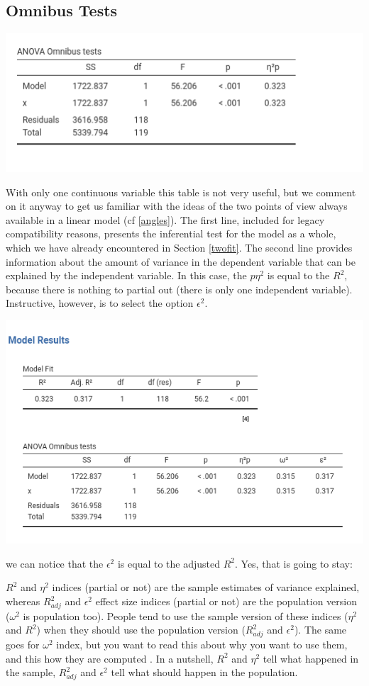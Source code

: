 \documentclass[
]{book}
\begin{document}
\hypertarget{omnibus-tests}{%
\subsection{Omnibus Tests}\label{omnibus-tests}}

\includegraphics[width=0.8\linewidth]{bookletpics/2_output3}

With only one continuous variable this table is not very useful, but we comment on it anyway to get us familiar with the ideas of the two points of view always available in a linear model (cf \ref{angles}). The first line, included for legacy compatibility reasons, presents the inferential test for the model as a whole, which we have already encountered in Section \ref{twofit}. The second line provides information about the amount of variance in the dependent variable that can be explained by the independent variable. In this case, the \(p\eta^2\) is equal to the \(R^2\), because there is nothing to partial out (there is only one independent variable). Instructive, however, is to select the option \(\epsilon^2\).

\includegraphics[width=0.9\linewidth]{bookletpics/2_output4}

we can notice that the \(\epsilon^2\) is equal to the adjusted \(R^2\). Yes, that is going to stay:

\(R^2\) and \(\eta^2\) indices (partial or not) are the sample estimates of variance explained, whereas \(R_{adj}^2\) and \(\epsilon^2\) effect size indices (partial or not) are the population version (\(\omega^2\) is population too). People tend to use the sample version of these indices (\(\eta^2\) and \(R^2\)) when they should use the population version (\(R^2_{adj}\) and \(\epsilon^2\)). The same goes for \(\omega^2\) index, but you want to read this about why you want to use them, and this how they are computed . In a nutshell, \(R^2\) and \(\eta^2\) tell what happened in the sample, \(R_{adj}^2\) and \(\epsilon^2\) tell what should happen in the population.
\end{document}
